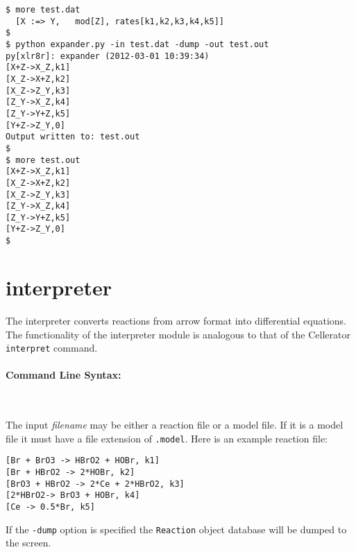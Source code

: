 \begin{verbatim}
$ more test.dat
  [X :=> Y,   mod[Z], rates[k1,k2,k3,k4,k5]]
$
$ python expander.py -in test.dat -dump -out test.out
py[xlr8r]: expander (2012-03-01 10:39:34)
[X+Z->X_Z,k1]
[X_Z->X+Z,k2]
[X_Z->Z_Y,k3]
[Z_Y->X_Z,k4]
[Z_Y->Y+Z,k5]
[Y+Z->Z_Y,0]
Output written to: test.out
$
$ more test.out
[X+Z->X_Z,k1]
[X_Z->X+Z,k2]
[X_Z->Z_Y,k3]
[Z_Y->X_Z,k4]
[Z_Y->Y+Z,k5]
[Y+Z->Z_Y,0]
$
\end{verbatim}



\newpage

\section{interpreter}

The interpreter converts reactions from arrow format into differential equations.  The functionality of the interpreter module is analogous to that of the Cellerator {\tt interpret} command. 

\paragraph{Command Line Syntax:}\ 


The input \textit{filename} may be either a reaction file or a model file. If it is a model file it must have a file extension of {\tt .model}. Here is an example reaction file:

\begin{Verbatim}[frame=single]
[Br + BrO3 -> HBrO2 + HOBr, k1] 
[Br + HBrO2 -> 2*HOBr, k2]
[BrO3 + HBrO2 -> 2*Ce + 2*HBrO2, k3] 
[2*HBrO2-> BrO3 + HOBr, k4] 
[Ce -> 0.5*Br, k5]
\end{Verbatim}

If the {\tt -dump} option is specified the {\tt Reaction} object database will be dumped to the screen.

